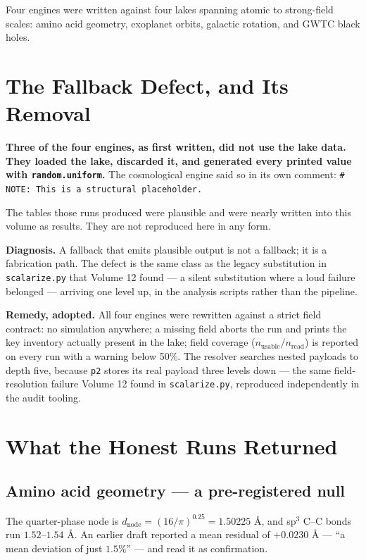 \documentclass[11pt, letterpaper, openany]{book}
\begin{document}
Four engines were written against four lakes spanning atomic to strong-field scales: amino acid
geometry, exoplanet orbits, galactic rotation, and GWTC black holes.

\section{The Fallback Defect, and Its Removal}

\begin{correctionbox}
\textbf{Three of the four engines, as first written, did not use the lake data. They loaded the
lake, discarded it, and generated every printed value with \texttt{random.uniform}.} The
cosmological engine said so in its own comment: \texttt{\# NOTE: This is a structural placeholder.}

\medskip
The tables those runs produced were plausible and were nearly written into this volume as results.
They are not reproduced here in any form.

\medskip
\textbf{Diagnosis.} A fallback that emits plausible output is not a fallback; it is a fabrication
path. The defect is the same class as the legacy substitution in \texttt{scalarize.py} that Volume 12
found --- a silent substitution where a loud failure belonged --- arriving one level up, in the
analysis scripts rather than the pipeline.

\medskip
\textbf{Remedy, adopted.} All four engines were rewritten against a strict field contract:
no simulation anywhere; a missing field aborts the run and prints the key inventory actually present
in the lake; field coverage ($n_{\text{usable}}/n_{\text{read}}$) is reported on every run with a
warning below 50\%. The resolver searches nested payloads to depth five, because \texttt{p2} stores
its real payload three levels down --- the same field-resolution failure Volume 12 found in
\texttt{scalarize.py}, reproduced independently in the audit tooling.
\end{correctionbox}

\section{What the Honest Runs Returned}

\subsection*{Amino acid geometry --- a pre-registered null}

The quarter-phase node is $d_{\text{node}} = (16/\pi)^{0.25} = 1.50225$ \AA, and sp$^3$ C--C bonds
run $1.52$--$1.54$ \AA. An earlier draft reported a mean residual of $+0.0230$ \AA{} --- ``a mean
deviation of just $1.5\%$'' --- and read it as confirmation.
\end{document}
